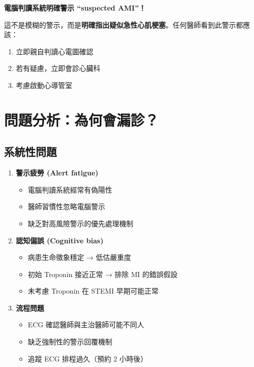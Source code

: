 \documentclass[12pt,a4paper]{article}
\begin{document}
\begin{alertbox}
\textbf{電腦判讀系統明確警示 ``suspected AMI''！}

這不是模糊的警示，而是\textbf{明確指出疑似急性心肌梗塞}。任何醫師看到此警示都應該：
\begin{enumerate}[noitemsep]
\item 立即親自判讀心電圖確認
\item 若有疑慮，立即會診心臟科
\item 考慮啟動心導管室
\end{enumerate}
\end{alertbox}

\newpage
\section{問題分析：為何會漏診？}

\subsection{系統性問題}

\begin{enumerate}[leftmargin=*]
\item \textbf{警示疲勞 (Alert fatigue)}
\begin{itemize}[noitemsep]
\item 電腦判讀系統經常有偽陽性
\item 醫師習慣性忽略電腦警示
\item 缺乏對高風險警示的優先處理機制
\end{itemize}

\item \textbf{認知偏誤 (Cognitive bias)}
\begin{itemize}[noitemsep]
\item 病患生命徵象穩定 → 低估嚴重度
\item 初始 Troponin 接近正常 → 排除 MI 的錯誤假設
\item 未考慮 Troponin 在 STEMI 早期可能正常
\end{itemize}

\item \textbf{流程問題}
\begin{itemize}[noitemsep]
\item ECG 確認醫師與主治醫師可能不同人
\item 缺乏強制性的警示回覆機制
\item 追蹤 ECG 排程過久（預約 2 小時後）
\end{itemize}
\end{enumerate}
\end{document}
